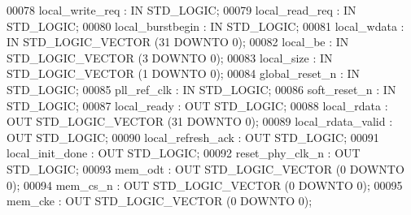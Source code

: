 \begin{DoxyCode}
00078         local_write_req : \textcolor{keywordflow}{IN} \textcolor{comment}{STD\_LOGIC};
00079         local_read_req      : \textcolor{keywordflow}{IN} \textcolor{comment}{STD\_LOGIC};
00080         local_burstbegin    : \textcolor{keywordflow}{IN} \textcolor{comment}{STD\_LOGIC};
00081         local_wdata         : \textcolor{keywordflow}{IN} \textcolor{comment}{STD\_LOGIC\_VECTOR} (\textcolor{vhdllogic}{}\textcolor{vhdllogic}{31} \textcolor{keywordflow}{DOWNTO} \textcolor{vhdllogic}{}\textcolor{vhdllogic}{0});
00082         local_be                : \textcolor{keywordflow}{IN} \textcolor{comment}{STD\_LOGIC\_VECTOR} (\textcolor{vhdllogic}{}\textcolor{vhdllogic}{3} \textcolor{keywordflow}{DOWNTO} \textcolor{vhdllogic}{}\textcolor{vhdllogic}{0});
00083         local_size          : \textcolor{keywordflow}{IN} \textcolor{comment}{STD\_LOGIC\_VECTOR} (\textcolor{vhdllogic}{}\textcolor{vhdllogic}{1} \textcolor{keywordflow}{DOWNTO} \textcolor{vhdllogic}{}\textcolor{vhdllogic}{0});
00084         global_reset_n      : \textcolor{keywordflow}{IN} \textcolor{comment}{STD\_LOGIC};
00085         pll_ref_clk         : \textcolor{keywordflow}{IN} \textcolor{comment}{STD\_LOGIC};
00086         soft_reset_n        : \textcolor{keywordflow}{IN} \textcolor{comment}{STD\_LOGIC};
00087         local_ready         : \textcolor{keywordflow}{OUT} \textcolor{comment}{STD\_LOGIC};
00088         local_rdata         : \textcolor{keywordflow}{OUT} \textcolor{comment}{STD\_LOGIC\_VECTOR} (\textcolor{vhdllogic}{}\textcolor{vhdllogic}{31} \textcolor{keywordflow}{DOWNTO} \textcolor{vhdllogic}{}\textcolor{vhdllogic}{0});
00089         local_rdata_valid   : \textcolor{keywordflow}{OUT} \textcolor{comment}{STD\_LOGIC};
00090         local_refresh_ack   : \textcolor{keywordflow}{OUT} \textcolor{comment}{STD\_LOGIC};
00091         local_init_done : \textcolor{keywordflow}{OUT} \textcolor{comment}{STD\_LOGIC};
00092         reset_phy_clk_n : \textcolor{keywordflow}{OUT} \textcolor{comment}{STD\_LOGIC};
00093         mem_odt             : \textcolor{keywordflow}{OUT} \textcolor{comment}{STD\_LOGIC\_VECTOR} (\textcolor{vhdllogic}{}\textcolor{vhdllogic}{0} \textcolor{keywordflow}{DOWNTO} \textcolor{vhdllogic}{}\textcolor{vhdllogic}{0});
00094         mem_cs_n                : \textcolor{keywordflow}{OUT} \textcolor{comment}{STD\_LOGIC\_VECTOR} (\textcolor{vhdllogic}{}\textcolor{vhdllogic}{0} \textcolor{keywordflow}{DOWNTO} \textcolor{vhdllogic}{}\textcolor{vhdllogic}{0});
00095         mem_cke             : \textcolor{keywordflow}{OUT} \textcolor{comment}{STD\_LOGIC\_VECTOR} (\textcolor{vhdllogic}{}\textcolor{vhdllogic}{0} \textcolor{keywordflow}{DOWNTO} \textcolor{vhdllogic}{}\textcolor{vhdllogic}{0});

\end{DoxyCode}
